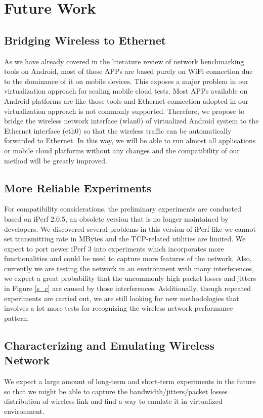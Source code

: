 \documentclass[journal,comsoc]{IEEEtran}
\begin{document}
\section{Future Work}
\subsection{Bridging Wireless to Ethernet}
As we have already covered in the literature review of network benchmarking tools on Android, most of those APPs are based purely on WiFi connection due to the dominance of it on mobile devices. This exposes a major problem in our virtualization approach for scaling mobile cloud tests. Most APPs available on Android platforms are like those tools and Ethernet connection adopted in our virtualization approach is not commonly supported. Therefore, we propose to bridge the wireless network interface (wlan0) of virtualized Android system to the Ethernet interface (eth0) so that the wireless traffic can be automatically forwarded to Ethernet. In this way, we will be able to run almost all applications or mobile cloud platforms without any changes and the compatibility of our method will be greatly improved.

\subsection{More Reliable Experiments}
For compatibility considerations, the preliminary experiments are conducted based on iPerf 2.0.5, an obsolete version that is no longer maintained by developers. We discovered several problems in this version of iPerf like we cannot set transmitting rate in MBytes and the TCP-related utilities are limited. We expect to port newer iPerf 3 into experiments which incorporates more functionalities and could be used to capture more features of  the network. Also, currently we are testing the network in an environment with many interferences, we expect a great probability that the uncommonly high packet losses and jitters in Figure \ref{s_c} are caused by those interferences. Additionally, though repeated experiments are carried out, we are still looking for new methodologies that involves a lot more tests for recognizing the wireless network performance pattern.

\subsection{Characterizing and Emulating Wireless Network}
We expect a large amount of long-term and short-term experiments in the future so that we might be able to capture the bandwidth/jitters/packet losses distribution of wireless link and find a way to emulate it in virtualized environment.
\ifCLASSOPTIONcaptionsoff
  \newpage
\fi
\end{document}
